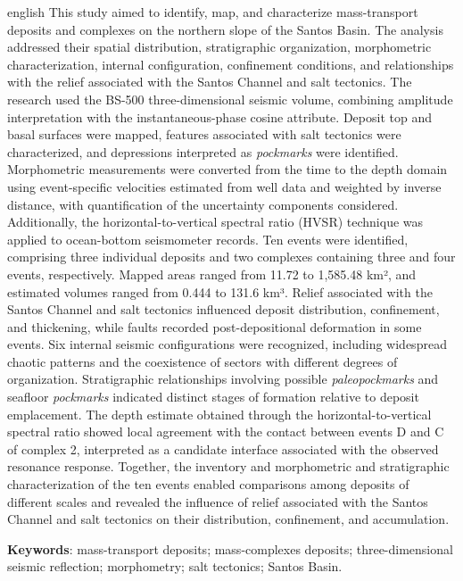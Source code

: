 \begin{resumo}[Abstract]
\SingleSpacing\setlength{\parindent}{0pt}
\begin{otherlanguage*}{english}
This study aimed to identify, map, and characterize mass-transport deposits and complexes on the northern slope of the Santos Basin. The analysis addressed their spatial distribution, stratigraphic organization, morphometric characterization, internal configuration, confinement conditions, and relationships with the relief associated with the Santos Channel and salt tectonics. The research used the BS-500 three-dimensional seismic volume, combining amplitude interpretation with the instantaneous-phase cosine attribute. Deposit top and basal surfaces were mapped, features associated with salt tectonics were characterized, and depressions interpreted as \textit{pockmarks} were identified. Morphometric measurements were converted from the time to the depth domain using event-specific velocities estimated from well data and weighted by inverse distance, with quantification of the uncertainty components considered. Additionally, the horizontal-to-vertical spectral ratio (HVSR) technique was applied to ocean-bottom seismometer records. Ten events were identified, comprising three individual deposits and two complexes containing three and four events, respectively. Mapped areas ranged from 11.72 to 1,585.48 km², and estimated volumes ranged from 0.444 to 131.6 km³. Relief associated with the Santos Channel and salt tectonics influenced deposit distribution, confinement, and thickening, while faults recorded post-depositional deformation in some events. Six internal seismic configurations were recognized, including widespread chaotic patterns and the coexistence of sectors with different degrees of organization. Stratigraphic relationships involving possible \textit{paleopockmarks} and seafloor \textit{pockmarks} indicated distinct stages of formation relative to deposit emplacement. The depth estimate obtained through the horizontal-to-vertical spectral ratio showed local agreement with the contact between events D and C of complex 2, interpreted as a candidate interface associated with the observed resonance response. Together, the inventory and morphometric and stratigraphic characterization of the ten events enabled comparisons among deposits of different scales and revealed the influence of relief associated with the Santos Channel and salt tectonics on their distribution, confinement, and accumulation.

\vspace{\onelineskip}
\noindent\textbf{Keywords}: mass-transport deposits; mass-complexes deposits; three-dimensional seismic reflection; morphometry; salt tectonics; Santos Basin.
\end{otherlanguage*}
\end{resumo}
